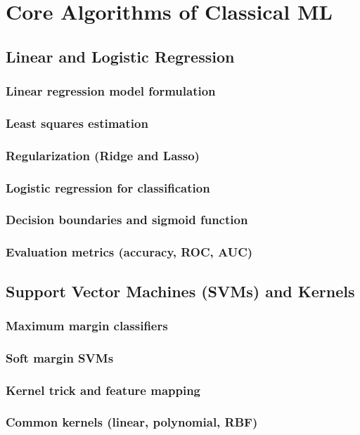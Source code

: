 \chapter{Core Algorithms of Classical ML}

\section{Linear and Logistic Regression}
\subsection{Linear regression model formulation}
\subsection{Least squares estimation}
\subsection{Regularization (Ridge and Lasso)}
\subsection{Logistic regression for classification}
\subsection{Decision boundaries and sigmoid function}
\subsection{Evaluation metrics (accuracy, ROC, AUC)}

\section{Support Vector Machines (SVMs) and Kernels}
\subsection{Maximum margin classifiers}
\subsection{Soft margin SVMs}
\subsection{Kernel trick and feature mapping}
\subsection{Common kernels (linear, polynomial, RBF)}
